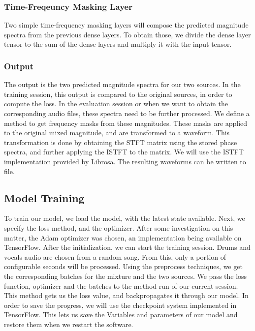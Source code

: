 \documentclass[../Thesis.tex]{subfiles}
\begin{document}
\subsubsection {Time-Freqeuncy Masking Layer}

Two simple time-frequency masking layers will compose the predicted magnitude spectra from the previous dense layers. To obtain those, we divide the dense layer tensor to the sum of the dense layers and multiply it with the input tensor.


\subsubsection {Output}

The output is the two predicted magnitude spectra for our two sources. In the training session, this output is compared to the original sources, in order to compute the loss. In the evaluation session or when we want to obtain the corresponding audio files, these spectra need to be further processed. We define a method to get frequency masks from these magnitudes. These masks are applied to the original mixed magnitude, and are transformed to a waveform. This transformation is done by obtaining the STFT matrix using the stored phase spectra, and further applying the ISTFT to the matrix. We will use the ISTFT implementation provided by Librosa. The resulting waveforms can be written to file.

\subsection {Model Training}

To train our model, we load the model, with the latest state available. Next, we specify the loss method, and the optimizer. After some investigation on this matter, the Adam optimizer was chosen, an implementation being available on TensorFlow. After the initialization, we can start the training session.  Drums and vocals audio are chosen from a random song. From this, only a portion of configurable seconds will be processed. Using the preprocess techniques, we get the corresponding batches for the mixture and the two sources. We pass the loss function, optimizer and the batches to the method run of our current session. This method gets us the loss value, and backpropagates it through our model. In order to save the progress, we will use the checkpoint system implemented in TensorFlow. This lets us save the Variables and parameters of our model and restore them when we restart the software. 
\end{document}
